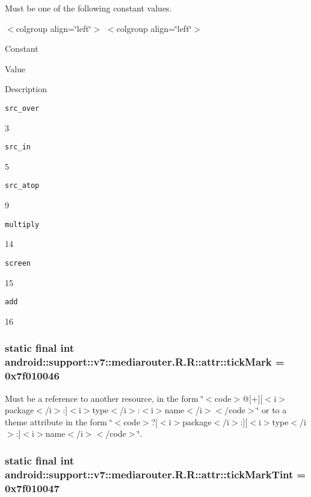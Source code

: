 Must be one of the following constant values. \begin{TabularC}{0}
\hline
\end{TabularC}
$<$colgroup align=\char`\"{}left\char`\"{}$>$ $<$colgroup align=\char`\"{}left\char`\"{}$>$ 

Constant

Value

Description 

{\tt src\_\-over}

3

{\tt src\_\-in}

5

{\tt src\_\-atop}

9

{\tt multiply}

14

{\tt screen}

15

{\tt add}

16\hypertarget{classandroid_1_1support_1_1v7_1_1mediarouter_1_1_r_1_1attr_9e252a6c81cbb456328ab02ae9b9e509}{
\subsubsection[{tickMark}]{\setlength{\rightskip}{0pt plus 5cm}static final int android::support::v7::mediarouter.R.R::attr::tickMark = 0x7f010046}}
\label{classandroid_1_1support_1_1v7_1_1mediarouter_1_1_r_1_1attr_9e252a6c81cbb456328ab02ae9b9e509}


Must be a reference to another resource, in the form \char`\"{}$<$code$>$@\mbox{[}+\mbox{]}\mbox{[}$<$i$>$package$<$/i$>$:\mbox{]}$<$i$>$type$<$/i$>$:$<$i$>$name$<$/i$>$$<$/code$>$\char`\"{} or to a theme attribute in the form \char`\"{}$<$code$>$?\mbox{[}$<$i$>$package$<$/i$>$:\mbox{]}\mbox{[}$<$i$>$type$<$/i$>$:\mbox{]}$<$i$>$name$<$/i$>$$<$/code$>$\char`\"{}. \hypertarget{classandroid_1_1support_1_1v7_1_1mediarouter_1_1_r_1_1attr_5cb4b89b9f897c1321c4d077189f0df3}{
\subsubsection[{tickMarkTint}]{\setlength{\rightskip}{0pt plus 5cm}static final int android::support::v7::mediarouter.R.R::attr::tickMarkTint = 0x7f010047}}
\label{classandroid_1_1support_1_1v7_1_1mediarouter_1_1_r_1_1attr_5cb4b89b9f897c1321c4d077189f0df3}


